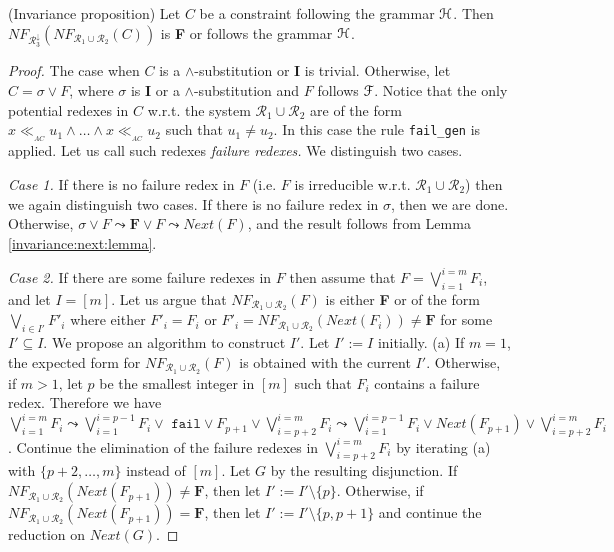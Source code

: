\documentclass[submission,copyright,creativecommons]{eptcs}
\newcommand \matchth[3]{#1 {\ll}_{{ }_{#3}} {#2}}
\newcommand \matchAC[2]{\matchth{#1}{#2}{AC}}
\newcommand \set[1]{\{#1\}}
\newcommand \Ronetwo{\ensuremath{\mathcal{R}_1\cup\mathcal{R}_2}}
\newcommand \Rthree{\ensuremath{\mathcal{R}_3^{\downarrow}}}
\newcommand \Eu[1]{\EuScript{#1}}
\numberwithin{subcase}{case}
\begin{document}
\begin{proposition}(Invariance proposition)
\label{inviariance:FN:prop}
Let $C$ be a constraint following the grammar $\Eu{H}$.
  Then 
  		\linebreak
  $\textit{NF}_{\Rthree}(\textit{NF}_{\Ronetwo}(C))$ is \textbf{F} or follows the grammar 
$\Eu{H}$.
\end{proposition}
\begin{proof}
The case when $C$ is a $\land$-substitution or \textbf{I} is trivial.
Otherwise, let $C=\sigma \lor F$, where $\sigma$ is \textbf{I} or a
$\land$-substitution and $F$ follows  $\Eu{F}$.
Notice that the only potential redexes in $C$  w.r.t. 
the system $\mathcal{R}_1\cup \mathcal{R}_2$ are of the form
$\matchAC{x}{u_1}\land \ldots \land \matchAC{x}{u_2}$ such that 
$u_1\neq u_2$. In this case the rule \texttt{fail\_gen} is
applied. Let us call such redexes \emph{failure redexes.}
We  distinguish two cases. 

\noindent \textit{Case 1.} If there is no 
 failure redex in $F$ (i.e. $F$ is irreducible w.r.t. $\Ronetwo$) 
then we again distinguish two cases. 
If there is no failure redex in $\sigma$, then we are done.
Otherwise, 
$\sigma \lor F \leadsto \textbf{F}\lor F \leadsto \textit{Next}(F)$,
and the result follows from Lemma \ref{invariance:next:lemma}.

\noindent \textit{Case 2.} If there are some failure redexes in $F$ then assume
that $F=\bigvee_{i=1}^{i=m}F_i$, and let $I=[m]$. Let us argue  that
$\textit{NF}_{\Ronetwo}(F)$  is either \textbf{F} or of the form $\bigvee_{i \in
I'}F'_i$ where either $F'_i=F_i$ or $F'_i=\textit{NF}_{\Ronetwo}(Next(F_i))\neq
\textbf{F}$ for some $I'\subseteq I$. We propose an algorithm to construct
$I'$. Let $I':=I$ initially. (a) If $m=1$, the expected form for
$\textit{NF}_{\Ronetwo}(F)$ is obtained with the current $I'$. Otherwise, if $m>1$, let
$p$ be the smallest integer in $[m]$ such that $F_i$ contains a failure redex.
Therefore we have $\bigvee_{i=1}^{i=m}F_i\leadsto \bigvee_{i=1}^{i=p-1}F_i \lor
\texttt{ fail} \lor  F_{p+1}\lor \bigvee_{i=p+2}^{i=m}F_i \leadsto
\bigvee_{i=1}^{i=p-1}F_i \lor  Next(F_{p+1})\lor \bigvee_{i=p+2}^{i=m}F_i$.
Continue the elimination of the failure redexes in $\bigvee_{i=p+2}^{i=m}F_i$ by
iterating (a) with $\{p+2, \ldots,m\}$ instead of $[m]$. Let $G$ by the
resulting disjunction. If $\textit{NF}_{\Ronetwo}(Next(F_{p+1}))\neq \textbf{F}$, then
let $I':=I'\setminus\set{p}$. Otherwise, if
$\textit{NF}_{\Ronetwo}(Next(F_{p+1}))=\textbf{F}$, then let
$I':=I'\setminus\set{p,p+1}$ and continue the reduction on
 $Next(G)$. 


\end{proof}
\end{document}
